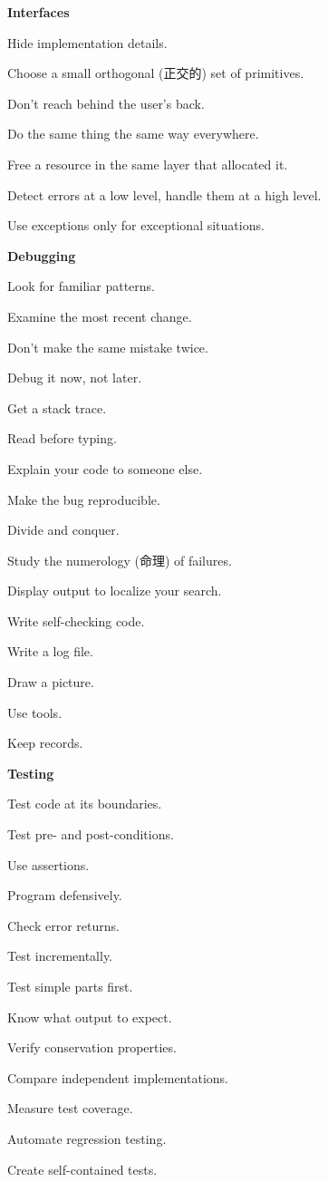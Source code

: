 {\Large\textbf{Interfaces}}
\begin{myitemize}
\item Hide implementation details.
\item Choose a small orthogonal (正交的) set of primitives.
\item Don't reach behind the user's back.
\item Do the same thing the same way everywhere.
\item Free a resource in the same layer that allocated it.
\item Detect errors at a low level, handle them at a high level.
\item Use exceptions only for exceptional situations.
\end{myitemize}

{\Large\textbf{Debugging}}
\begin{myitemize}
\item Look for familiar patterns.
\item Examine the most recent change.
\item Don't make the same mistake twice.
\item Debug it now, not later.
\item Get a stack trace.
\item Read before typing.
\item Explain your code to someone else.
\item Make the bug reproducible.
\item Divide and conquer.
\item Study the numerology (命理) of failures.
\item Display output to localize your search.
\item Write self-checking code.
\item Write a log file.
\item Draw a picture.
\item Use tools.
\item Keep records.
\end{myitemize}

{\Large\textbf{Testing}}
\begin{myitemize}
\item Test code at its boundaries.
\item Test pre- and post-conditions.
\item Use assertions.
\item Program defensively.
\item Check error returns.
\item Test incrementally.
\item Test simple parts first.
\item Know what output to expect.
\item Verify conservation properties.
\item Compare independent implementations.
\item Measure test coverage.
\item Automate regression testing.
\item Create self-contained tests.
\end{myitemize}


